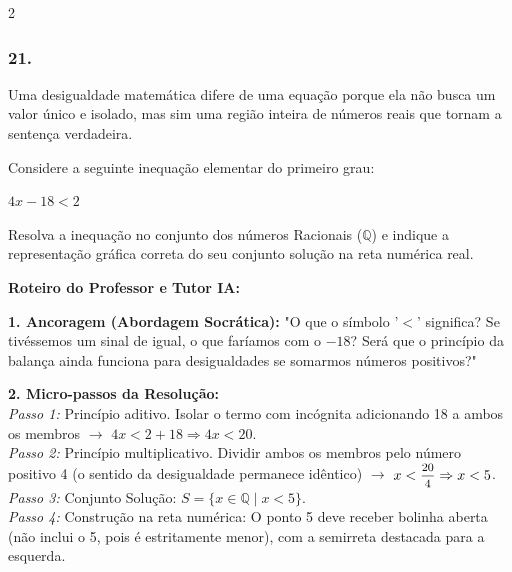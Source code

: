 \begin{multicols*}{2}
\subsubsection*{21.} 
\begin{enunciadoLiteral}
Uma desigualdade matemática difere de uma equação porque ela não busca um valor único e isolado, mas sim uma região inteira de números reais que tornam a sentença verdadeira.

Considere a seguinte inequação elementar do primeiro grau:

$ 4x - 18 < 2 $

Resolva a inequação no conjunto dos números Racionais ($\mathbb{Q}$) e indique a representação gráfica correta do seu conjunto solução na reta numérica real.
\end{enunciadoLiteral}

\ifgabarito
    \begin{tcolorbox}[colback=CorTitUm!5, colframe=CorTitUm, boxrule=1pt, arc=4pt, left=6pt, right=6pt, top=6pt, bottom=6pt]
    \small\textbf{\textcolor{CorTitUm}{Roteiro do Professor e Tutor IA:}}\par\vspace{0.1cm}
    \color{CinzaEscuro}
    \textbf{1. Ancoragem (Abordagem Socrática):} "O que o símbolo '$<$' significa? Se tivéssemos um sinal de igual, o que faríamos com o $-18$? Será que o princípio da balança ainda funciona para desigualdades se somarmos números positivos?"\par\vspace{0.1cm}
    
    \textbf{2. Micro-passos da Resolução:}\\
    \textit{Passo 1:} Princípio aditivo. Isolar o termo com incógnita adicionando 18 a ambos os membros $\rightarrow$ $4x < 2 + 18 \Rightarrow 4x < 20$.\\
    \textit{Passo 2:} Princípio multiplicativo. Dividir ambos os membros pelo número positivo 4 (o sentido da desigualdade permanece idêntico) $\rightarrow$ $x < \mfrac{20}{4} \Rightarrow x < 5$.\\
    \textit{Passo 3:} Conjunto Solução: $S = \{x \in \mathbb{Q} \mid x < 5\}$.\\
    \textit{Passo 4:} Construção na reta numérica: O ponto 5 deve receber bolinha aberta (não inclui o 5, pois é estritamente menor), com a semirreta destacada para a esquerda.\par\vspace{0.1cm}
    

\end{tcolorbox}
\end{multicols*}
